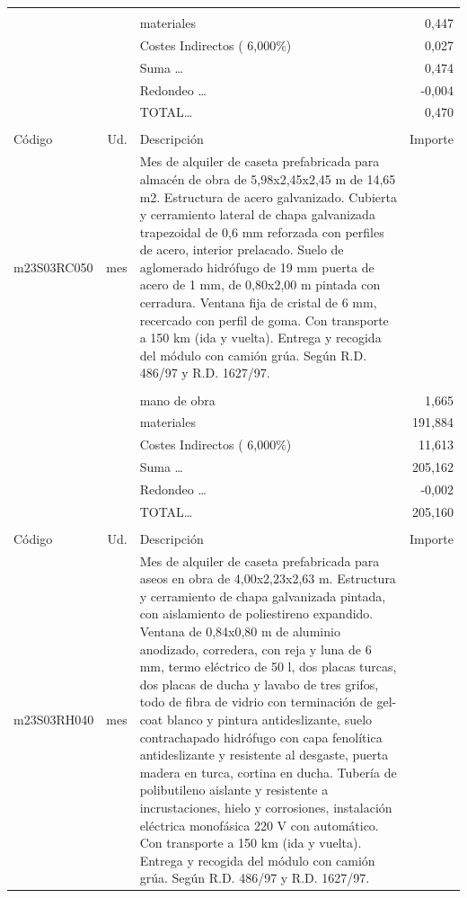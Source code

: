 \documentclass{book}%
\begin{document}
\begin{supertabular}{l r p{60mm} r}
&&&\\%
&&materiales&     0,447\\%
&&Costes Indirectos (     6,000\%)&     0,027\\%
&&Suma \ldots&     0,474\\%
&&Redondeo \ldots&    {-}0,004\\%
%
&&TOTAL\ldots&     0,470\\%
&&&\\%
Código&Ud.&Descripción&Importe\\%
\hline%
m23S03RC050&mes&Mes de alquiler de caseta prefabricada para almacén de obra de 5,98x2,45x2,45 m de 14,65 m2. Estructura de acero galvanizado. Cubierta y cerramiento lateral de chapa galvanizada trapezoidal de 0,6 mm reforzada con perfiles de acero, interior prelacado. Suelo de aglomerado hidrófugo de 19 mm puerta de acero de 1 mm, de 0,80x2,00 m pintada con cerradura. Ventana fija de cristal de 6 mm, recercado con perfil de goma. Con transporte a 150 km (ida y vuelta). Entrega y recogida del módulo con camión grúa. Según R.D. 486/97 y R.D. 1627/97.&\\%
&&&\\%
&&mano de obra&     1,665\\%
&&materiales&   191,884\\%
&&Costes Indirectos (     6,000\%)&    11,613\\%
&&Suma \ldots&   205,162\\%
&&Redondeo \ldots&    {-}0,002\\%
%
&&TOTAL\ldots&   205,160\\%
&&&\\%
Código&Ud.&Descripción&Importe\\%
\hline%
m23S03RH040&mes&Mes de alquiler de caseta prefabricada para aseos en obra de 4,00x2,23x2,63 m. Estructura y cerramiento de chapa galvanizada pintada, con aislamiento de poliestireno expandido. Ventana de 0,84x0,80 m de aluminio anodizado, corredera, con reja y luna de 6 mm, termo eléctrico de 50 l, dos placas turcas, dos placas de ducha y lavabo de tres grifos, todo de fibra de vidrio con terminación de gel{-}coat blanco y pintura antideslizante, suelo contrachapado hidrófugo con capa fenolítica antideslizante y resistente al desgaste, puerta madera en turca, cortina en ducha. Tubería de polibutileno aislante y resistente a incrustaciones, hielo y corrosiones, instalación eléctrica monofásica 220 V con automático. Con transporte a 150 km (ida y vuelta). Entrega y recogida del módulo con camión grúa. Según R.D. 486/97 y R.D. 1627/97.&\\%

\end{supertabular}
\end{document}
